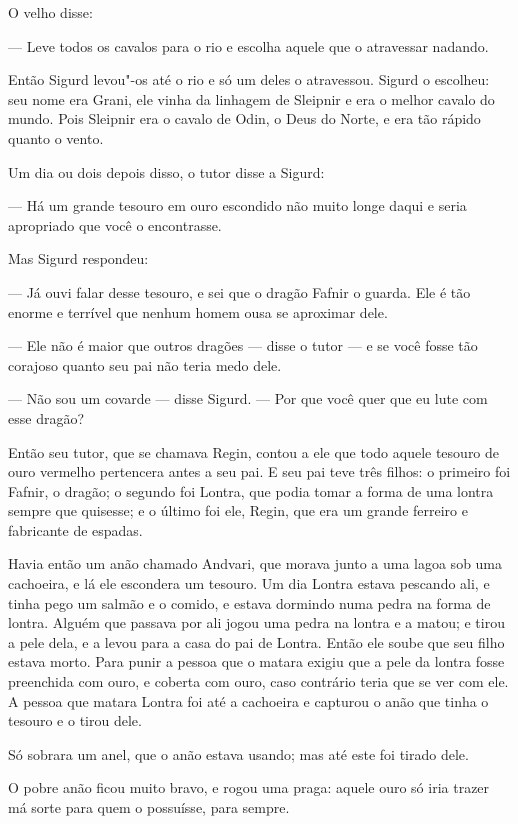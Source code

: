 O velho disse:

--- Leve todos os cavalos para o rio e escolha aquele que o atravessar
nadando. 

Então Sigurd levou"-os até o rio e só um deles o atravessou. Sigurd o
escolheu: seu nome era Grani, ele vinha da linhagem de Sleipnir e era
o melhor cavalo do mundo. Pois Sleipnir era o cavalo de Odin, o Deus
do Norte, e era tão rápido quanto o vento. 

Um dia ou dois depois disso, o tutor disse a Sigurd:

--- Há um grande tesouro em ouro escondido não muito longe daqui e
seria apropriado que você o encontrasse. 

Mas Sigurd respondeu:

--- Já ouvi falar desse tesouro, e sei que o dragão Fafnir o guarda.
Ele é tão enorme e terrível que nenhum homem ousa se aproximar dele.

--- Ele não é maior que outros dragões --- disse o tutor --- e se você fosse
tão corajoso quanto seu pai não teria medo dele. 

--- Não sou um covarde --- disse Sigurd. --- Por que você quer que eu lute
com esse dragão? 

Então seu tutor, que se chamava Regin, contou a ele que todo aquele
tesouro de ouro vermelho pertencera antes a seu pai. E seu pai teve
três filhos: o primeiro foi Fafnir, o dragão; o segundo foi Lontra,
que podia tomar a forma de uma lontra sempre que quisesse; e o último
foi ele, Regin, que era um grande ferreiro e fabricante de espadas. 

Havia então um anão chamado Andvari, que morava junto a uma lagoa sob
uma cachoeira, e lá ele escondera um tesouro. Um dia Lontra estava
pescando ali, e tinha pego um salmão e o comido, e estava dormindo
numa pedra na forma de lontra. Alguém que passava por ali jogou uma
pedra na lontra e a matou; e tirou a pele dela, e a levou para a casa
do pai de Lontra. Então ele soube que seu filho estava morto. Para
punir a pessoa que o matara exigiu que a pele da lontra fosse preenchida
com ouro, e coberta com ouro, caso contrário teria que se ver com ele. A
pessoa que matara Lontra foi até a cachoeira e capturou o anão que
tinha o tesouro e o tirou dele. 

Só sobrara um anel, que o anão estava usando; mas até este foi tirado
dele. 

O pobre anão ficou muito bravo, e rogou uma praga: aquele ouro só iria
trazer má sorte para quem o possuísse, para sempre. 

